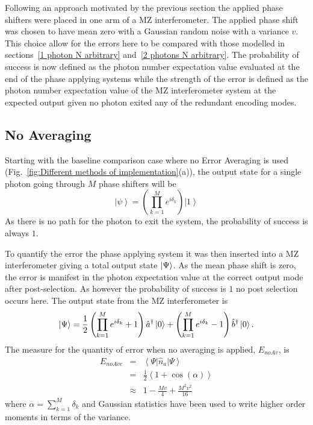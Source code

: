 \documentclass[aps,pra,twocolumn,superscriptaddress,numerical,floatfix]{revtex4-1}
\begin{document}
Following an approach motivated by the previous section the applied phase shifters were placed in one arm of a MZ interferometer. The applied phase shift was chosen to have mean zero with a Gaussian random noise with a variance $v$. This choice allow for the errors here to be compared with those modelled in sections~\ref{1 photon N arbitrary} and~\ref{2 photons N arbitrary}. The probability of success is now defined as the photon number expectation value evaluated at the end of the phase applying systems while the strength of the error is defined as the photon number expectation value of the MZ interferometer system at the expected output given no photon exited any of the redundant encoding modes. 


\subsection{No Averaging\label{No Averaging}}

Starting with the baseline comparison case where no Error Averaging is used (Fig.~\ref{fig:Different methods of implementation}(a)), the output state for a single photon going through $M$ phase shifters will be
\begin{equation}
\left|\psi\right\rangle =\left(\prod_{k=1}^{M}e^{i\delta_{k}}\right)\left|1\right\rangle \label{eq:noAvPhaseState}
\end{equation}
As there is no path for the photon to exit the system, the probability of success is always $1$.

To quantify the error the phase applying system it was then inserted into a MZ interferometer giving a total output state $\ket{\Psi}$.  As the mean phase shift is zero, the error is manifest in the photon expectation value at the correct output mode after post-selection. As however the probability of success is $1$ no post selection occurs here.  The output state from the MZ interferometer is
\begin{equation}
	\ket{\Psi} =\frac{1}{2}\left(\prod_{k=1}^{M}e^{i\delta_{k}}+1\right)\hat{a}^{\dagger}\ket{0}+\left(\prod_{k=1}^{M}e^{i\delta_{k}}-1\right)\hat{b}^{\dagger}\ket{0}. \label{eq:noAveIntState}
\end{equation}
The measure for the quantity of error when no averaging is applied, $E_{noAv}$, is
\begin{eqnarray}
E_{noAve} & = & \left\langle \Psi\right|\hat{n}_{a}\left|\Psi\right\rangle \nonumber \\
& = & \frac{1}{2}\left\langle 1+\cos\left(\alpha\right)\right\rangle \nonumber \\
& \approx & 1-\frac{Mv}{4}+\frac{M^{2}v^{2}}{16}\label{eq:ErrorNoAv1}
\end{eqnarray}
where $\alpha=\sum_{k=1}^{M}\delta_{k}$ and Gaussian statistics have been used to write higher order moments in terms of the variance.
\end{document}
